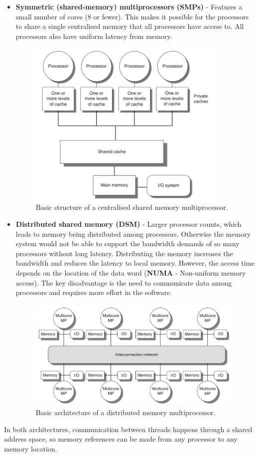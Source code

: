 \documentclass[11pt]{article}
\begin{document}
\begin{itemize}
\item \textbf{Symmetric (shared-memory) multiprocessors (SMPs)} - Features a small number of cores (8 or fewer). This makes it possible for the processors to share a single centralised memory that all processors have access to. All processors also have uniform latency from memory. 
\begin{figure}[H]
\centering
\includegraphics[width=0.9\textwidth, keepaspectratio]{imgs/smp.png}
\caption{Basic structure of a centralised shared memory multiprocessor.}
\end{figure}
\item \textbf{Distributed shared memory (DSM)} - Larger processor counts, which leads to memory being distributed among processors. Otherwise the memory system would not be able to support the bandwidth demands of so many processors without long latency. Distributing the memory increases the bandwidth and reduces the latency to local memory. However, the access time depends on the location of the data word (\textbf{NUMA} - Non-uniform memory access). The key disadvantage is the need to communicate data among processors and requires more effort in the software.  
\begin{figure}[H]
\centering
\includegraphics[width=1\textwidth, keepaspectratio]{imgs/dsm.png}
\caption{Basic architecture of a distributed memory multiprocessor.}
\end{figure}
\end{itemize}
In both architectures, communication between threads happens through a shared address space, so memory references can be made from any processor to any memory location. 
\end{document}
